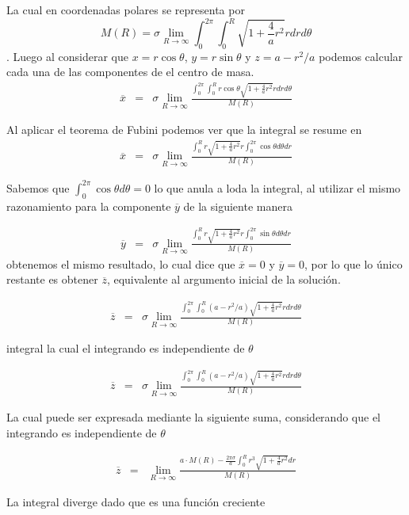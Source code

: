 \documentclass{article}
\begin{document}
\begin{enumerate}
	La cual en coordenadas polares se representa por
	$$M(R) = \sigma \lim_{R\to\infty} \int_0^{2\pi} \int_{0}^{R} \sqrt{1+\frac{4}{a}r^2}rdrd\theta$$.
	Luego al considerar que $x = r \cos \theta$, $y = r \sin \theta$ y $z = a-r^2/a$ podemos calcular cada una de las componentes de el centro de masa.
\begin{eqnarray*}
	\overline{x} &=& \sigma \lim_{R\to\infty} \frac{ \int_0^{2\pi} \int_{0}^{R} 	r 	\cos \theta \sqrt{1+\frac{4}{a}r^2}rdrd\theta}{M(R)}
\end{eqnarray*}

Al aplicar el teorema de Fubini podemos ver que la integral se resume en \begin{eqnarray*}
	\overline{x} &=& \sigma \lim_{R\to\infty} \frac{ \int_{0}^{R} r \sqrt{1+\frac{4}{a}r^2}r \int_0^{2\pi}\cos \theta d\theta dr}{M(R)}
\end{eqnarray*}

Sabemos que $\int_0^{2\pi}\cos \theta d\theta = 0$ lo que anula a loda la integral, al utilizar el mismo razonamiento para la componente $\overline{y}$ de la siguiente manera

\begin{eqnarray*}
	\overline{y} &=& \sigma \lim_{R\to\infty} \frac{ \int_{0}^{R} r \sqrt{1+\frac{4}{a}r^2}r \int_0^{2\pi}\sin \theta d\theta dr}{M(R)}
\end{eqnarray*} obtenemos el mismo resultado, lo cual dice que
$\overline{x}=0$ y $\overline{y}=0$, por lo que lo único restante es obtener $\overline{z}$, equivalente al argumento inicial de la solución.

\begin{eqnarray*}
	\overline{z} &=& \sigma \lim_{R\to\infty} \frac{ \int_0^{2\pi} \int_{0}^{R}(a-r^2/a)\sqrt{1+\frac{4}{a}r^2}rdrd\theta}{M(R)}
\end{eqnarray*}

integral la cual el integrando es independiente de $\theta$

\begin{eqnarray*}
	\overline{z} &=& \sigma \lim_{R\to\infty} \frac{ \int_0^{2\pi} \int_{0}^{R}(a-r^2/a)\sqrt{1+\frac{4}{a}r^2}rdrd\theta}{M(R)}
\end{eqnarray*}

La cual puede ser expresada mediante la siguiente suma, considerando que el integrando es independiente de $\theta$

\begin{eqnarray*}
	\overline{z} &=&  \lim_{R\to\infty} \frac{ a\cdot M(R)-\frac{2\pi\sigma}{a}  \int_{0}^{R}r^3\sqrt{1+\frac{4}{a}r^2}dr}{M(R)}
\end{eqnarray*}

La integral diverge dado que es una función creciente

	\end{enumerate}
\end{document}
